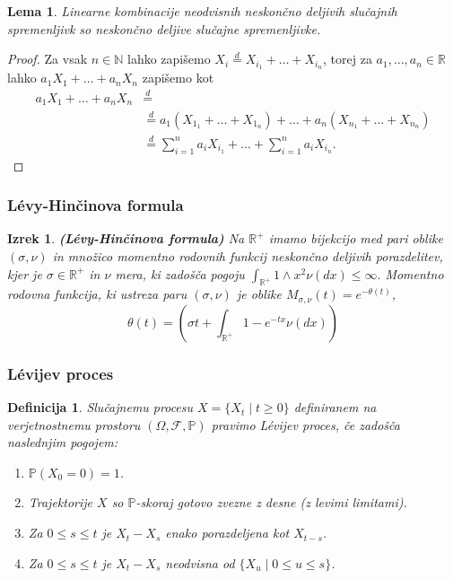 \documentclass[]{beamer} %
\theoremstyle{plain}
\newtheorem{izrek}{Izrek}
\newtheorem{definicija}{Definicija}
\newtheorem{lema}{Lema}
\begin{document}
\begin{frame}
  \begin{lema}
    Linearne kombinacije neodvisnih neskončno deljivih slučajnih spremenljivk so neskončno deljive slučajne spremenljivke.
\end{lema}


\begin{proof}
    Za vsak $n \in \mathbb{N}$ lahko zapišemo $X_i \stackrel{d}{=} X_{i_1} + \dots + X_{i_n}$, torej za
    $a_1, \dots, a_n \in \mathbb{R}$ lahko $a_1X_1 + \dots + a_nX_n$ zapišemo kot 
    \begin{align*}
        a_1X_1 + \dots + a_nX_n &\stackrel{d}{=} \\
                                &\stackrel{d}{=} a_1(X_{1_1} + \dots + X_{1_n}) + \dots + a_n(X_{n_1} + \dots + X_{n_n}) \\
                                &\stackrel{d}{=} \sum_{i=1}^na_iX_{i_1} + \dots + \sum_{i=1}^na_iX_{i_n}.
    \end{align*}
\end{proof}
\end{frame}


\begin{frame}
  \frametitle{Lévy-Hinčinova formula}
  \begin{izrek}
    \textbf{(Lévy-Hinčinova formula)} Na $\mathbb{R}^+$ imamo bijekcijo med pari oblike
    $(\sigma, \nu)$ in množico momentno rodovnih funkcij neskončno deljivih porazdelitev,
    kjer je $\sigma \in \mathbb{R}^+$ in $\nu$ mera, ki zadošča pogoju $\int_{\mathbb{R}^+}1 \wedge x^2 \nu(dx)\leq \infty.$
    Momentno rodovna funkcija, ki ustreza paru $(\sigma, \nu)$ je oblike $M_{\sigma, \nu}(t) = e^{-\theta(t)}$,
    $$
      \theta(t) = \left(\sigma t + \int_{\mathbb{R}^+}1 - e^{-tx} \nu(dx)\right)
    $$
    
  \end{izrek}
\end{frame}

\begin{frame}
  \frametitle{Lévijev proces}
  \begin{definicija}
      Slučajnemu procesu $X = \{X_t \mid t \geq 0\}$ definiranem na verjetnostnemu
      prostoru $(\Omega, \mathcal{F}, \mathds{P})$ pravimo \textit{Lévijev proces}, če zadošča naslednjim pogojem:
      \begin{enumerate}
          \item $\mathds{P}(X_0 = 0)=1$.
          \item Trajektorije $X$ so $\mathds{P}$-skoraj gotovo zvezne z desne (z levimi limitami).
          \item Za $0 \leq s \leq t$ je $X_t - X_s$ enako porazdeljena kot $X_{t-s}$.
          \item Za $0 \leq s \leq t$ je $X_t - X_s$ neodvisna od $\{X_u \mid 0 \leq u \leq s\}$.
      \end{enumerate}
  \end{definicija}
\end{frame}
\end{document}

